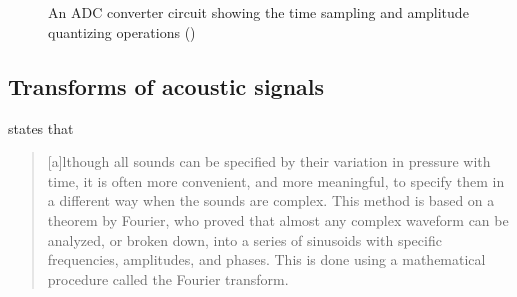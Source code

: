\documentclass[report.tex]{subfiles}
\begin{document}
\begin{figure}[ht]
	\centering
	\hspace{0.1em}
	\\
	\vspace{0.1em}
	\\
	\caption{An ADC converter circuit showing the time sampling and amplitude quantizing operations (\cite[Chapter~4]{discretebook})}
	\label{fig:adccircuit}
\end{figure}

\newpagefill

\subsection{Transforms of acoustic signals}
\label{sec:freqdomain}

\textcite[Chapter~2B]{moore} states that

\begin{quote}
	[a]lthough all sounds can be specified by their variation in pressure with time, it is often more convenient, and more meaningful, to specify them in a different way when the sounds are complex. This method is based on a theorem by Fourier, who proved that almost any complex waveform can be analyzed, or broken down, into a series of sinusoids with specific frequencies, amplitudes, and phases. This is done using a mathematical procedure called the Fourier transform.
\end{quote}
\end{document}
